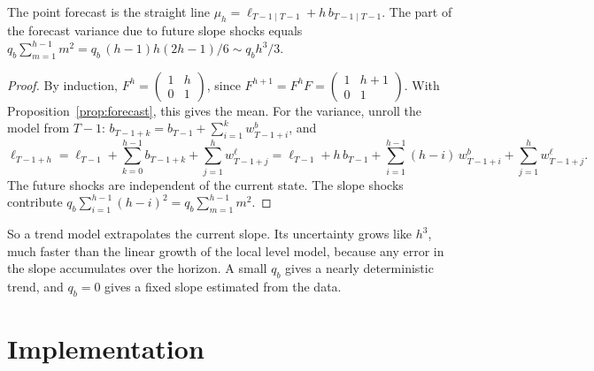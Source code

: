 \documentclass[11pt,a4paper]{article}
\begin{document}
\begin{proposition}\label{prop:llt}
The point forecast is the straight line $\mu_h=\ell_{T-1\mid T-1}+h\,b_{T-1\mid T-1}$. The
part of the forecast variance due to future slope shocks equals
$q_b\sum_{m=1}^{h-1}m^2=q_b\,(h-1)h(2h-1)/6\sim q_bh^3/3$.
\end{proposition}
\begin{proof}
By induction, $F^h=\begin{pmatrix}1&h\\0&1\end{pmatrix}$, since
$F^{h+1}=F^hF=\begin{pmatrix}1&h+1\\0&1\end{pmatrix}$. With
Proposition~\ref{prop:forecast}, this gives the mean. For the variance, unroll the model from $T-1$:
$b_{T-1+k}=b_{T-1}+\sum_{i=1}^{k}w^b_{T-1+i}$, and
\[
  \ell_{T-1+h} = \ell_{T-1} + \sum_{k=0}^{h-1} b_{T-1+k} + \sum_{j=1}^{h} w^\ell_{T-1+j}
               = \ell_{T-1} + h\,b_{T-1} + \sum_{i=1}^{h-1}(h-i)\,w^b_{T-1+i} + \sum_{j=1}^{h}w^\ell_{T-1+j}.
\]
The future shocks are independent of the current state. The slope shocks contribute
$q_b\sum_{i=1}^{h-1}(h-i)^2=q_b\sum_{m=1}^{h-1}m^2$.
\end{proof}

So a trend model extrapolates the current slope. Its uncertainty grows like $h^3$,
much faster than the linear growth of the local level model, because any
error in the slope accumulates over the horizon. A small $q_b$ gives a nearly
deterministic trend, and $q_b=0$ gives a fixed slope estimated from the data.

\section{Implementation}
\end{document}
